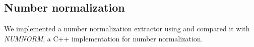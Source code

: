 \subsection{Number normalization}
\label{sec:sec:number}

We implemented a number normalization extractor using \framework and 
compared it with {\em NUMNORM}, a 
C++ implementation for number normalization.

%

\newcommand*{\fvtextcolor}[2]{\textcolor{#1}{#2}}

